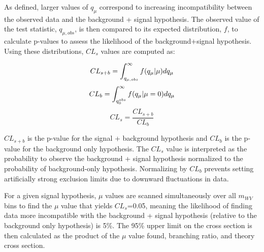 As defined, larger values of $q_{\mu}$ correspond to increasing incompatibility between the observed data and the background + signal hypothesis. The observed value of the test statistic, $q_{\mu, obs}$, is then compared to its expected distribution, $f$, to calculate p-values to assess the likelihood of the background+signal hypothesis. Using these distributions, $CL_{s}$ values are computed as:
 
 \begin{equation}
 CL_{s+b}=\int_{q_{\mu, obs}}^{\infty}f(q_{\mu}|\mu)dq_{\mu}\\
 \end{equation}
  \begin{equation}
CL_{b}=\int_{q_{0}^{obs}}^{\infty}f(q_{\mu}|\mu=0)dq_{\mu}\\
 \end{equation}
  \begin{equation}
CL_{s}=\frac{CL_{s+b}}{CL_{b}}
 \end{equation}

$CL_{s+b}$ is the p-value for the signal + background hypothesis and $CL_{b}$ is the p-value for the background only hypothesis. The $CL_{s}$ value is interpreted as the probability to observe the background + signal hypothesis normalized to the probability of background-only hypothesis. Normalizing by $CL_{b}$ prevents setting artificially strong exclusion limits due to downward fluctuations in data. 

For a given signal hypothesis, $\mu$ values are scanned simultaneously over all $m_{WV}$ bins to find the $\mu$ value that yields $CL_{s}$=0.05, meaning the likelihood of finding data more incompatible with the background + signal hypothesis (relative to the background only hypothesis) is 5\%. The 95\% upper limit on the cross section is then calculated as the product of the $\mu$ value found, branching ratio, and theory cross section.







